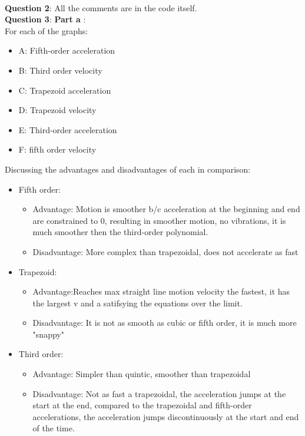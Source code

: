 \documentclass{article}
\begin{document}
\\
\textbf{Question 2}:
All the comments are in the code itself.\\
\textbf{Question 3}:
\textbf{ Part a }:\\
For each of the graphs:
\begin{itemize}
    \item A: Fifth-order acceleration
\item B: Third order velocity
\item C: Trapezoid acceleration
\item D: Trapezoid velocity
\item E: Third-order acceleration 
\item F: fifth order velocity
\end{itemize}
Discussing the advantages and disadvantages of each in comparison:
\begin{itemize}
    \item Fifth order:
    \begin{itemize}
        \item Advantage: Motion is smoother b/c acceleration at the beginning and end are constrained to 0, resulting in smoother motion, no vibrations, it is much smoother then the third-order polynomial.
        \item  Disadvantage:  More complex than trapezoidal, does not accelerate as fast
    \end{itemize}
    \item Trapezoid:
      \begin{itemize}
        \item Advantage:Reaches max straight line motion velocity the fastest, it has the largest v and a satifsying the equations over the limit.
        \item  Disadvantage:  It is not as smooth as cubic or fifth order, it is much more "snappy"
    \end{itemize}
    \item Third order:
    \begin{itemize}
        \item Advantage: Simpler than quintic, smoother than trapezoidal
        \item  Disadvantage:  Not as fast a trapezoidal, the acceleration jumps at the start at the end, compared to the trapezoidal and fifth-order accelerations, the acceleration jumps discontinuously at the start and end of the time.
    \end{itemize}
\end{itemize}
\end{document}
